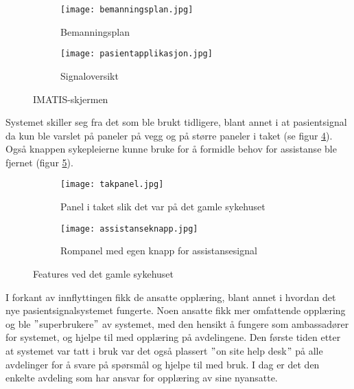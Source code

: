 \begin{figure}[H]
        \centering
        \begin{subfigure}[b]{1.0\textwidth}
        		\centering
                \texttt{[image: bemanningsplan.jpg]}
                \caption{Bemanningsplan}
                \label{IMATSISbemanningsplan}
        \end{subfigure}
        
        \begin{subfigure}[b]{1.0\textwidth}
        		\centering
                \texttt{[image: pasientapplikasjon.jpg]}
                \caption{Signaloversikt}
                \label{IMATISpasientapplikasjon}
        \end{subfigure}
        \caption{IMATIS-skjermen}
        \label{IMATISskjermen}
\end{figure}

\noindent
Systemet skiller seg fra det som ble brukt tidligere, blant annet i at pasientsignal da kun ble varslet på paneler på vegg og på større paneler i taket (se figur \ref{takpanel}). Også knappen sykepleierne kunne bruke for å formidle behov for assistanse ble fjernet (figur \ref{assistanseknapp}). 

\begin{figure}[H]
        \centering
        \begin{subfigure}[b]{1.0\textwidth}
        		\centering
                \texttt{[image: takpanel.jpg]}
                \caption{Panel i taket slik det var på det gamle sykehuset}
                \label{takpanel}
        \end{subfigure}
        
        \begin{subfigure}[b]{1.0\textwidth}
        		\centering
                \texttt{[image: assistanseknapp.jpg]}
                \caption{Rompanel med egen knapp for assistansesignal}
                \label{assistanseknapp}
        \end{subfigure}
        \caption{Features ved det gamle sykehuset}
        \label{takass}
\end{figure}


\noindent
I forkant av innflyttingen fikk de ansatte opplæring, blant annet i hvordan det nye pasientsignalsystemet fungerte. Noen ansatte fikk mer omfattende opplæring og ble $"$superbrukere$"$ av systemet, med den hensikt å fungere som ambassadører for systemet, og hjelpe til med opplæring på avdelingene. Den første tiden etter at systemet var tatt i bruk var det også plassert $"$on site help desk$"$ på alle avdelinger for å svare på spørsmål og hjelpe til med bruk. I dag er det den enkelte avdeling som har ansvar for opplæring av sine nyansatte. 


